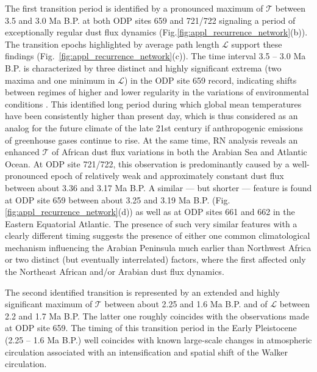 		The first transition period is identified by a pronounced maximum of $\mathcal{T}$ between 3.5 and 3.0 Ma B.P. at both ODP sites 659 and 721/722 signaling a period of exceptionally regular dust flux dynamics (Fig.\ref{fig:appl_recurrence_network}(b)). The transition epochs highlighted by average path length $\mathcal{L}$ support these findings (Fig.~\ref{fig:appl_recurrence_network}(c)). The time interval 3.5 -- 3.0 Ma B.P. is characterized by three distinct and highly significant extrema (two maxima and one minimum in $\mathcal{L}$) in the ODP site 659 record, indicating shifts between regimes of higher and lower regularity in the variations of environmental conditions \cite{Donges2011a}. This identified long period during which global mean temperatures have been consistently higher than present day, which is thus considered as an analog for the future climate of the late 21st century if anthropogenic emissions of greenhouse gases continue to rise. At the same time, RN analysis reveals an enhanced $\mathcal{T}$ of African dust flux variations in both the Arabian Sea and Atlantic Ocean. At ODP site 721/722, this observation is predominantly caused by a well-pronounced epoch of relatively weak and approximately constant dust flux between about 3.36 and 3.17 Ma B.P. A similar --- but shorter --- feature is found at ODP site 659 between about 3.25 and 3.19 Ma B.P. (Fig. \ref{fig:appl_recurrence_network}(d)) as well as at ODP sites 661 and 662 in the Eastern Equatorial Atlantic. The presence of such very similar features with a clearly different timing suggests the presence of either one common climatological mechanism influencing the Arabian Peninsula much earlier than Northwest Africa or two distinct (but eventually interrelated) factors, where the first affected only the Northeast African and/or Arabian dust flux dynamics.

		The second identified transition is represented by an extended and highly significant maximum of $\mathcal{T}$ between about 2.25 and 1.6 Ma B.P. and of $\mathcal{L}$ between 2.2 and 1.7 Ma B.P. The latter one roughly coincides with the observations made at ODP site 659. The timing of this transition period in the Early Pleistocene (2.25 -- 1.6 Ma B.P.) well coincides with known large-scale changes in atmospheric circulation associated with an intensification and spatial shift of the Walker circulation.


